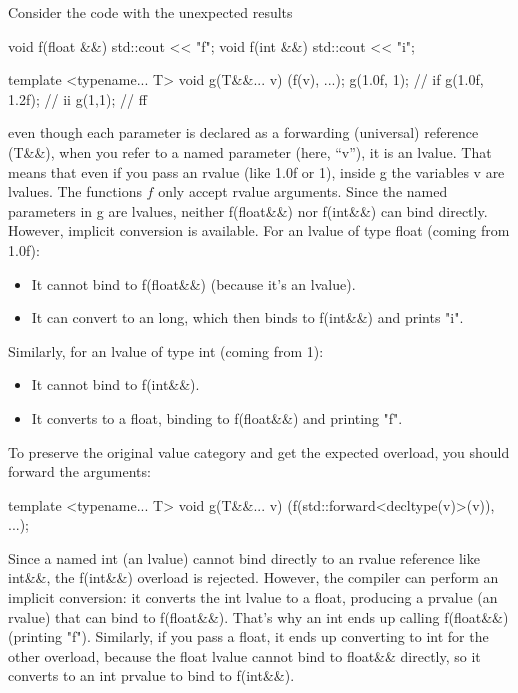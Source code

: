 \documentclass{report}
\begin{document}
\pagebreak 
{}
\bigbreak \noindent 
Consider the code with the unexpected results 
\bigbreak \noindent 
\begin{cppcode}
    void f(float &&) { std::cout << "f"; }
    void f(int &&) { std::cout << "i"; }

    template <typename... T>
    void g(T&&... v)
    {
        (f(v), ...);
    }
    g(1.0f, 1); // if
    g(1.0f, 1.2f); // ii
    g(1,1); // ff
\end{cppcode}
\bigbreak \noindent 
even though each parameter is declared as a forwarding (universal) reference (T\&\&), when you refer to a named parameter (here, “v”), it is an lvalue. That means that even if you pass an rvalue (like 1.0f or 1), inside g the variables v are lvalues.
\bigbreak \noindent 
The functions $f$ only accept rvalue arguments. Since the named parameters in g are lvalues, neither f(float\&\&) nor f(int\&\&) can bind directly. However, implicit conversion is available. For an lvalue of type float (coming from 1.0f):
\begin{itemize}
    \item It cannot bind to f(float\&\&) (because it’s an lvalue).
    \item It can convert to an long, which then binds to f(int\&\&) and prints "i".
\end{itemize}
\bigbreak \noindent 
Similarly, for an lvalue of type int (coming from 1):
\begin{itemize}
    \item It cannot bind to f(int\&\&).
    \item It converts to a float, binding to f(float\&\&) and printing "f".
\end{itemize}
\bigbreak \noindent 
To preserve the original value category and get the expected overload, you should forward the arguments:
\bigbreak \noindent 
\begin{cppcode}
    template <typename... T>
    void g(T&&... v) {
        (f(std::forward<decltype(v)>(v)), ...);
    }
\end{cppcode}
\bigbreak \noindent 
Since a named int (an lvalue) cannot bind directly to an rvalue reference like int\&\&, the f(int\&\&) overload is rejected. However, the compiler can perform an implicit conversion: it converts the int lvalue to a float, producing a prvalue (an rvalue) that can bind to f(float\&\&). That’s why an int ends up calling f(float\&\&) (printing "f").
\bigbreak \noindent 
Similarly, if you pass a float, it ends up converting to int for the other overload, because the float lvalue cannot bind to float\&\& directly, so it converts to an int prvalue to bind to f(int\&\&).






























    





    
\end{document}
